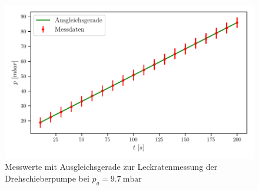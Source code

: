     \begin{figure}[H]
      \centering
      \includegraphics{build/plots/leck_dreh_9.7.pdf}
      \caption{Messwerte mit Ausgleichsgerade zur Leckratenmessung der Drehschieberpumpe bei $p_g = \SI{9.7}{\milli\bar}$}
      \label{fig:plotd2}
    \end{figure}

